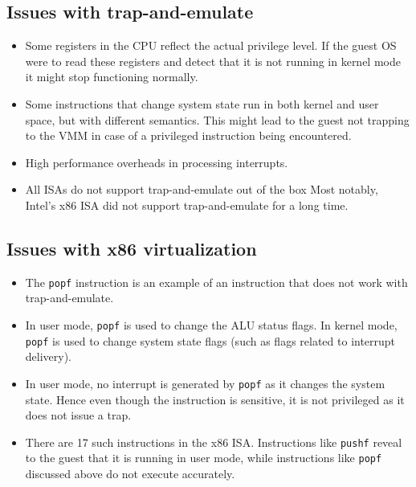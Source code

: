 \documentclass{article}
\begin{document}
\subsection{Issues with trap-and-emulate}
\begin{itemize}
    \item Some registers in the CPU reflect the actual privilege level. If the guest OS were to read these registers and detect that it is not running in kernel mode it might stop functioning normally. 
    
    \item Some instructions that change system state run in both kernel and user space, but with different semantics. This might lead to the guest not trapping to the VMM in case of a privileged instruction being encountered. 
    
    \item High performance overheads in processing interrupts. 
    
    \item All ISAs do not support trap-and-emulate out of the box Most notably, Intel's x86 ISA did not support trap-and-emulate for a long time. 
\end{itemize}

\subsection{Issues with x86 virtualization}
\label{x86}
\begin{itemize}
    \item The \texttt{popf} instruction is an example of an instruction that does not work with trap-and-emulate.
    
    \item In user mode, \texttt{popf} is used to change the ALU status flags. In kernel mode, \texttt{popf} is used to change system state flags (such as flags related to interrupt delivery).
    
    \item In user mode, no interrupt is generated by \texttt{popf} as it changes the system state. Hence even though the instruction is sensitive, it is not privileged as it does not issue a trap. 
    
    \item There are 17 such instructions in the x86 ISA. Instructions like \texttt{pushf} reveal to the guest that it is running in user mode, while instructions like \texttt{popf} discussed above do not execute accurately.
\end{itemize}
\end{document}
